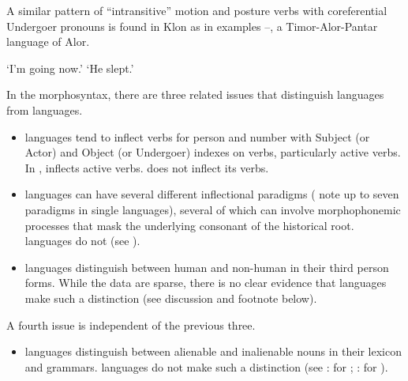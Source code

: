 A similar pattern of “intransitive” motion
and posture verbs with coreferential Undergoer pronouns is found
in Klon \citep[50--51, 81--84]{Banamtuan2021} as in examples --,
a Timor-Alor-Pantar language of Alor.

\begin{exe}
			\glt	‘I'm going now.’
						\label{ex:07-13}
			\glt	‘He slept.’
						\label{ex:07-14}
\end{exe}

In the morphosyntax, there are three related issues that distinguish
 languages from  languages.

\begin{itemize}
	\item	{} languages tend to inflect verbs for person
				and number with Subject (or Actor)
				and Object (or Undergoer) indexes on verbs, particularly active verbs.
				In ,  inflects active verbs.
				 does not inflect its verbs.
	\item	{} languages can have several different inflectional
				paradigms (\citet{Collins1982c,Collins1983} note up to seven paradigms in single languages),
				several of which can involve morphophonemic processes that mask
				the underlying consonant of the historical root.
				 languages do not
				(see ).
	\item	{} languages distinguish between human
				and non-human in their third person forms.
				While the data are sparse,
				there is no clear evidence that  languages make
				such a distinction (see discussion and footnote below).
\end{itemize}

A fourth issue is independent of the previous three.

\begin{itemize}
	\item	{} languages distinguish between alienable
				and inalienable nouns in their lexicon and grammars.
				 languages do not make such a distinction (see
				\citet[277-292]{Grimes1991c}: for ;
				\citet[280--293]{Bloyd2020}: for ).
\end{itemize}


